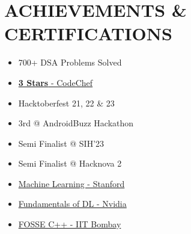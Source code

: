 \documentclass[letterpaper,11pt]{article}
\newcommand\sbullet[1][.5]{\mathbin{\vcenter{\hbox{\scalebox{#1}{$\bullet$}}}}}
\begin{document}
 
\section{ACHIEVEMENTS \& CERTIFICATIONS}
 \vspace{-1pt}

        \begin{multicols}{3}
            \begin{itemize}[itemsep=-4pt]
                \item 700+ DSA Problems Solved
                \item \href{https://www.codechef.com/users/ruthlessruler}{\textbf{3 Stars} - CodeChef {\raisebox{-0.1\height}{\faExternalLink*}} }
                \item Hacktoberfest 21, 22 \& 23
                \item 3rd @ AndroidBuzz Hackathon
                \item Semi Finalist @ SIH'23
                \item Semi Finalist @ Hacknova 2
                \item \href{https://coursera.org/share/c715d24542b410805a2ff3034949858d}{Machine Learning - Stanford {\raisebox{-0.1\height}{\faExternalLink*} }}
                \item \href{https://learn.next.courses.nvidia.com/certificates/b38a698150c5410c9afeb954cf87468c}{Fundamentals of DL - Nvidia {\raisebox{-0.1\height}{\faExternalLink*} }}
                \item \href{https://drive.google.com/file/d/1Oaf6gFga_AUU0Hix6qJHQsRd7Hopzjin/view}{FOSSE C++ - IIT Bombay {\raisebox{-0.1\height}{\faExternalLink*} }}

            \end{itemize}
        \end{multicols}

\end{document}
